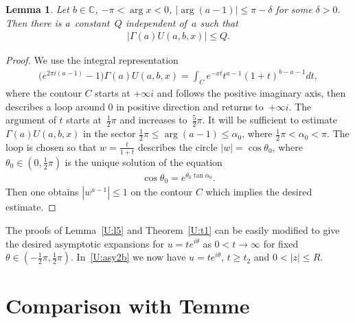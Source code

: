 \documentclass[pdftex]{sigma}
\newcommand{\C}{\mathbb{C}}
\numberwithin{equation}{section}
\newtheorem{Lemma}[Theorem]{Lemma}
{ \theoremstyle{definition}
\newtheorem{Remarks}[Theorem]{Remarks} }
\begin{document}
\begin{Lemma}\label{U:l6}
Let $b\in\C$, $-\pi<\arg x<0$, $|\arg (a-1)|\le \pi-\delta$ for some $\delta>0$. Then there is a~constant~$Q$ independent of~$a$ such that
\begin{gather*} |\Gamma(a)U(a,b,x)|\le Q .\end{gather*}
\end{Lemma}

\begin{proof}
We use the integral representation \cite[(13.4.14)]{NIST}
\begin{gather*} \big(e^{2\pi i(a-1)}-1\big)\Gamma(a)U(a,b,x)=\int_C e^{-xt}t^{a-1}(1+t)^{b-a-1} dt ,
\end{gather*}
where the contour $C$ starts at $+\infty i$ and follows the positive
imaginary axis, then describes a loop around $0$ in positive direction and returns to~$+\infty i$.
The argument of $t$ starts at~$\frac12\pi$ and increases to~$\frac52\pi$.
It will be suf\/f\/icient to estimate $\Gamma(a)U(a,b,x)$ in the sector $\frac12\pi\le \arg(a-1)\le \alpha_0$, where $\frac12\pi<\alpha_0<\pi$.
The loop is chosen so that $w=\frac{t}{1+t}$ describes the circle $|w|=\cos\theta_0$, where $\theta_0\in(0,\frac12\pi)$ is the unique solution of
the equation
\begin{gather*} \cos\theta_0=e^{\theta_0\tan\alpha_0} .
\end{gather*}
Then one obtains $|w^{a-1}|\le 1$ on the contour $C$ which implies the desired estimate.
\end{proof}

The proofs of Lemma~\ref{U:l5} and Theorem~\ref{U:t1} can be easily modif\/ied to give the desired asymptotic expansions for $u=te^{i\theta}$ as $0<t\to\infty$
for f\/ixed $\theta\in(-\frac12\pi,\frac12\pi)$.
In~\eqref{U:asy2b} we now have $u=te^{i\theta}$, $t\ge t_2$ and $0<|z|\le R$.

\section{Comparison with Temme \cite{T}}\label{Temme}
\end{document}
